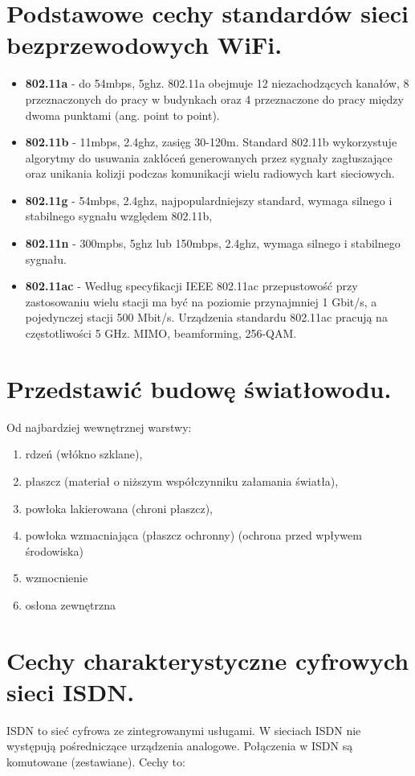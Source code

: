\documentclass[12pt,a4paper]{article}
\begin{document}
	\section{Podstawowe cechy standardów sieci bezprzewodowych WiFi.}
	\begin{itemize}
		\item \textbf{802.11a} - do 54mbps, 5ghz. 802.11a obejmuje 12 niezachodzących kanałów, 8 przeznaczonych do pracy w budynkach oraz 4 przeznaczone do pracy między dwoma punktami (ang. point to point). 
		\item \textbf{802.11b} - 11mbps, 2.4ghz, zasięg 30-120m. Standard 802.11b wykorzystuje algorytmy do usuwania zakłóceń generowanych przez sygnały zagłuszające oraz unikania kolizji podczas komunikacji wielu radiowych kart sieciowych.
		\item \textbf{802.11g} - 54mbps, 2.4ghz, najpopulardniejszy standard, wymaga silnego i stabilnego sygnału względem 802.11b,
		\item \textbf{802.11n} - 300mpbs, 5ghz lub 150mbps, 2.4ghz, wymaga silnego i stabilnego sygnału.
		\item \textbf{802.11ac} - Według specyfikacji IEEE 802.11ac przepustowość przy zastosowaniu wielu stacji ma być na poziomie przynajmniej 1 Gbit/s, a pojedynczej stacji 500 Mbit/s. Urządzenia standardu 802.11ac pracują na częstotliwości 5 GHz. MIMO, beamforming, 256-QAM.
	\end{itemize}

	\section{Przedstawić budowę światłowodu.}
	Od najbardziej wewnętrznej warstwy:	
	\begin{enumerate}
		\item rdzeń (włókno szklane), 
		\item płaszcz (materiał o niższym współczynniku załamania światła), 
		\item powłoka lakierowana (chroni płaszcz), 
		\item powłoka wzmacniająca (płaszcz ochronny) (ochrona przed wpływem środowiska)
		\item wzmocnienie
		\item osłona zewnętrzna
	\end{enumerate}

	\section{Cechy charakterystyczne cyfrowych sieci ISDN.}
	ISDN to sieć cyfrowa ze zintegrowanymi usługami. W sieciach ISDN nie występują pośredniczące urządzenia analogowe. Połączenia w ISDN są komutowane (zestawiane). Cechy to:
	
\end{document}
